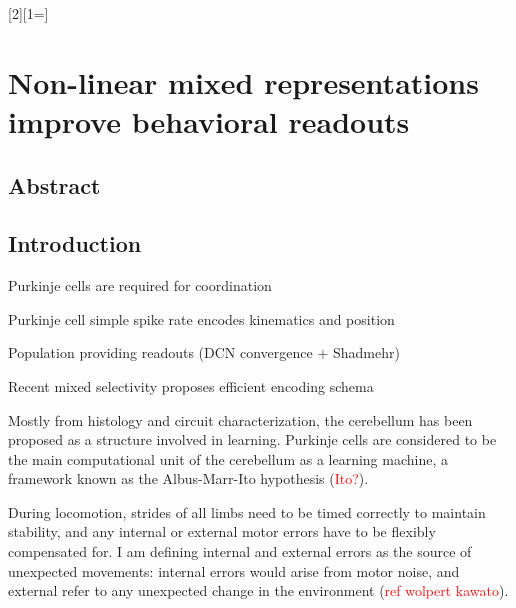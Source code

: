 
%
\label{cha:neurobehav}

[2][1=]{}

\chapter{Non-linear mixed representations improve behavioral readouts} 

\pagebreak

\section{Abstract}
\section{Introduction}


\begin{compactitem}
    \scriptsize
    \item Purkinje cells are required for coordination
    \item Purkinje cell simple spike rate encodes kinematics and position
    \item Population providing readouts (DCN convergence + Shadmehr)
    \item Recent mixed selectivity proposes efficient encoding schema
\end{compactitem}

\vspace{10pt}

Mostly from histology and circuit characterization, the cerebellum has been proposed as a structure involved in learning. Purkinje cells are considered to be the main computational unit of the cerebellum as a learning machine, a framework known as the Albus-Marr-Ito hypothesis (\textcolor{red}{Ito?}). 


During locomotion, strides of all limbs need to be timed correctly to maintain stability, and any internal or external motor errors have to be flexibly compensated for. I am defining internal and external errors as the source of unexpected movements: internal errors would arise from motor noise, and external refer to any unexpected change in the environment (\textcolor{red}{ref wolpert kawato}). 

